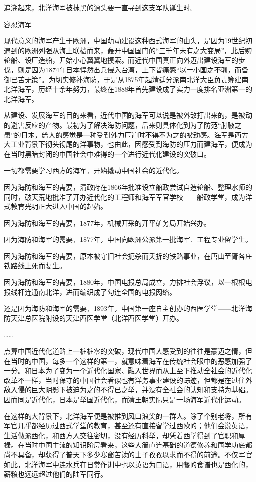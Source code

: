 \documentclass[12pt,UTF8]{ctexbook}
\begin{document}
追溯起来，北洋海军被抹黑的源头要一直寻到这支军队诞生时。

容忍海军

现代意义的海军产生于欧洲，中国萌动建设这种西式海军的由头，是因为19世纪初遇到的欧洲列强从海上联樯而来，轰开中国国门的“三千年未有之大变局”，此后购轮船、设厂造船，开始小心翼翼地摸索。而近代中国真正向外迈出建设海军的步伐，则是因为1874年日本悍然出兵侵入台湾，上下皆痛感“以一小国之不驯，而备御已苦无策”。为切实修补海防，于是从1875年起清廷分派南北洋大臣负责筹建南北洋海军，历经十余年努力，最终在1888年首先建设成了实力一度排名亚洲第一的北洋海军。

从建设、发展海军的目的来看，近代中国的海军可以说是被外敌打出来的，是被动的避害反应的产物。最初为了解决海防问题，后来则具体化到为了防范“肘腋之患”的日本，给人的感觉是一种受到外力压迫时不得不为之的被动感。海军是西方大工业背景下彻头彻尾的洋事物，也由此，因感受到海防的压力而建海军，便成为在当时黑暗封闭的中国社会中难得的一个进行近代化建设的突破口。

一切都需要学习西方的海军，开始撬动中国社会的近代化。

因为海防和海军的需要，清政府在1866年批准设立船政尝试自造轮船、整理水师的同时，破天荒地批准了开办近代化的工程师和海军军官学校——船政学堂，成为洋式教育光明正大进入中国的起始。

因为海防和海军的需要，1877年，机械开采的开平矿务局开始兴办。

因为海防和海军的需要，1877年，中国向欧洲公派第一批海军、工程专业留学生。

因为海防和海军的需要，原本被守旧社会扼杀而夭折的铁路事业，在唐山至胥各庄铁路线上死而复生。

因为海防和海军的需要，1880年，中国电报总局成立，力排社会浮议，以一根根电报线杆连通南北洋，进而编织成了勾连全国的电报网络。

还是因为海防和海军的需要，1893年，中国第一座自主创办的西医学堂——北洋海防天津总医院附设的天津西医学堂（北洋西医学堂）开办。

……

点算中国近代化道路上一桩桩零的突破，现代中国人感受到的往往是豪迈之情，但在当时的中国，每多一个这样的第一，就意味着海军在传统社会眼中的恶感加强了一分。和日本为了变为一个近代化国家、融入世界而从上至下推动全社会的近代化改革不一样，当时保守的中国社会看似也有洋务事业建设的踪迹，但都是在过往外敌入侵的巨大阴影下被迫为之的不得已之举，并没有全社会的认知和支持为基础。因而同是近代化，日本是举国近代化，而清王朝实际只是一场海军近代化运动。

在这样的大背景下，北洋海军便是被推到风口浪尖的一群人。除了个别老将，所有军官几乎都经历过西式学堂的教育，甚至还有直接留学过西欧的；他们会说英语，生活做派西化，和西方人交往密切，没有经历科举，却凭着西学得到了官职和厚禄。在当时中国主流的知识阶层看来，这些人简直连基础的道德修养和国学功底都尚不具备，却获得了普天下多少寒窗苦读的士子孜孜以求而不得的前途。不仅军官如此，北洋海军中连水兵在日常作训中也以英语为口语，用餐的食谱也是西化的，薪粮也远远超过他们的陆军同行。
\end{document}

